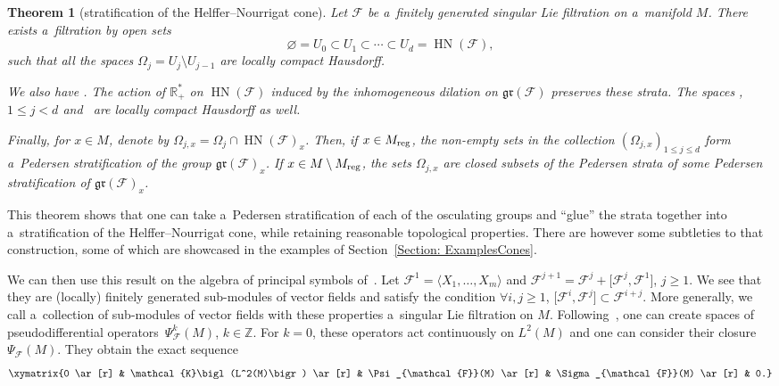 \documentclass[pdftex]{sigma}
\newcommand{\R}{\mathbb R} %
\newcommand{\Z}{\mathbb Z} %
\newcommand{\F}{\mathcal{F}} %
\newcommand{\HN}{\operatorname{HN}} %
\newcommand{\Fb}{\mathcal{F}} %
\newcommand{\gr}{\mathfrak{gr}} %
\numberwithin{equation}{section}
\newtheorem{thm}{Theorem}[section]
\theoremstyle{definition}
\begin{document}
\begin{thm}[stratification of the Helffer--Nourrigat cone]\label{Theorem:Stratification}
 Let $\Fb$ be a~finitely generated singular Lie filtration on a~manifold $M$. There exists a~filtration by open sets
 \[\varnothing = U_0 \subset U_1 \subset \cdots \subset U_d = \HN(\Fb),\]
 such that all the spaces $\Omega_j = U_j\setminus U_{j-1}$ are locally compact Hausdorff.

 We also have \smash{$\HN_0(\Fb) = \bigsqcup_{j=1}^{d-1} \Omega_j \sqcup (\Omega_d \setminus M)$}.
 The action of $\R^*_+$ on $\HN(\Fb)$ induced by the inhomogeneous dilation on $\gr(\Fb)$ preserves these strata. The spaces \smash{${\Omega_j}/{\R^*_+}$}, $1\leq j < d$ and~\smash{${(\Omega_d\setminus M)}/{\R^*_+}$} are locally compact Hausdorff as well.

 Finally, for $x\in M$, denote by $\Omega_{j,x} = \Omega_j\cap \HN(\Fb)_{x}$. Then, if $x \in M_{\rm reg}$, the non-empty sets in the collection $(\Omega_{j,x})_{1\leq j \leq d}$ form a~Pedersen stratification of the group $\gr(\Fb)_x$. If $x \in M \setminus M_{\rm reg}$, the sets $\Omega_{j,x}$ are closed subsets of the Pedersen strata of some Pedersen stratification of $\gr(\Fb)_x$.
\end{thm}

This theorem shows that one can take a~Pedersen stratification of each of the osculating groups and ``glue'' the strata together into a~stratification of the Helffer--Nourrigat cone, while retaining reasonable topological properties. There are however some subtleties to that construction, some of which are showcased in the examples of Section~\ref{Section: ExamplesCones}.

We can then use this result on the algebra of principal symbols of~\cite{AMYMaximalHypoellipticity}. Let $\mathcal{F}^1 = \langle X_1,\dots,X_m\rangle$ and $\mathcal{F}^{j+1} = \mathcal{F}^j + \big[\mathcal{F}^j,\mathcal{F}^1\big]$, $j\geq 1$. We see that they are (locally) finitely generated sub-modules of vector fields and satisfy the condition $
\forall i,j\geq 1$, $ \big[\F^i,\F^j\big]\subset \F^{i+j}$.
More generally, we call a~collection of sub-modules of vector fields with these properties a~singular Lie filtration on $M$. Following~\cite{AMYMaximalHypoellipticity}, one can create spaces of pseudodifferential operators~${\Psi_{\Fb}^k(M)}$, $k \in \Z$. For $k = 0$, these operators act continuously on $L^2(M)$ and one can consider their closure $\Psi_{\Fb}(M)$. They obtain the exact sequence
\[\xymatrix{0 \ar[r] & \mathcal{K}\bigl(L^2(M)\bigr) \ar[r] & \Psi_{\Fb}(M) \ar[r] & \Sigma_{\Fb}(M) \ar[r] & 0.}\]
\end{document}
